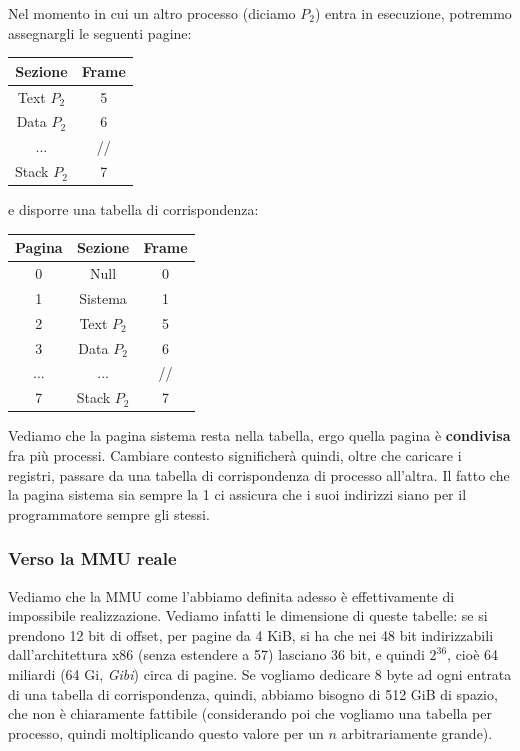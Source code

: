 \documentclass[a4paper,11pt]{article}
\begin{document}
Nel momento in cui un altro processo (diciamo $P_2$) entra in esecuzione, potremmo assegnargli le seguenti pagine:
\begin{table}[H]
	\center
	\begin{tabular} { | c | c | }
		\bfseries Sezione & \bfseries Frame \\
		\hline
		\textsf{Text} $P_2$ & 5 \\
		\textsf{Data} $P_2$ & 6 \\
		... & // \\
		\textsf{Stack} $P_2$ & 7 \\
	\end{tabular}
\end{table}

\newpage

e disporre una tabella di corrispondenza:
\begin{table}[H]
	\center
	\begin{tabular} { | c | c | c | }
		\bfseries Pagina & \bfseries Sezione & \bfseries Frame \\
		\hline
		0 & \textsf{Null} & 0 \\
		1 & \textsf{Sistema} & 1 \\
		2 & \textsf{Text} $P_2$ & 5 \\
		3 & \textsf{Data} $P_2$ & 6 \\
		... &... & // \\
		7 & \textsf{Stack} $P_2$ & 7 \\
	\end{tabular}
\end{table}

Vediamo che la pagina sistema resta nella tabella, ergo quella pagina è \textbf{condivisa} fra più processi.
Cambiare contesto significherà quindi, oltre che caricare i registri, passare da una tabella di corrispondenza di processo all'altra.
Il fatto che la pagina sistema sia sempre la 1 ci assicura che i suoi indirizzi siano per il programmatore sempre gli stessi.

\subsubsection{Verso la MMU reale}
Vediamo che la MMU come l'abbiamo definita adesso è effettivamente di impossibile realizzazione.
Vediamo infatti le dimensione di queste tabelle: se si prendono 12 bit di offset, per pagine da 4 KiB, si ha che nei 48 bit indirizzabili dall'architettura x86 (senza estendere a 57) lasciano 36 bit, e quindi $2^{36}$, cioè 64 miliardi (64 Gi, \textit{Gibi}) circa di pagine.
Se vogliamo dedicare 8 byte ad ogni entrata di una tabella di corrispondenza, quindi, abbiamo bisogno di 512 GiB di spazio, che non è chiaramente fattibile (considerando poi che vogliamo una tabella per processo, quindi moltiplicando questo valore per un $n$ arbitrariamente grande).
\end{document}
